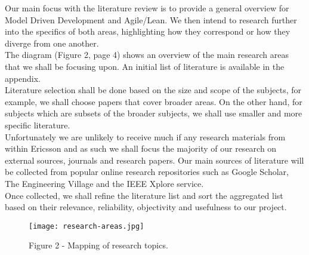 \documentclass[ProjectPlan_innit.tex]{subfiles}
\begin{document}
Our main focus with the literature review is to provide a general overview for Model Driven Development and Agile/Lean. We then intend to research further into the specifics of both areas, highlighting how they correspond or how they diverge from one another. 
\hspace{0pt} \\

The diagram (Figure 2, page 4) shows an overview of the main research areas that we shall be focusing upon. An initial list of literature is available in the appendix.
\hspace{0pt} \\

Literature selection shall be done based on the size and scope of the subjects, for example, we shall choose papers that cover broader areas. On the other hand, for subjects which are subsets of the broader subjects, we shall use smaller and more specific literature.
\hspace{0pt} \\

Unfortunately we are unlikely to receive much if any research materials from within Ericsson and as such we shall focus the majority of our research on external sources, journals and research papers. Our main sources of literature will be collected from popular online research repositories such as Google Scholar, The Engineering Village and the IEEE Xplore service. 
\hspace{0pt} \\

Once collected, we shall refine the literature list and sort the aggregated list based on their relevance, reliability, objectivity and usefulness to our project. 
\hspace{0pt} \\

\begin{figure*}[H!]
  \texttt{[image: research-areas.jpg]}
  \caption{Figure 2 - Mapping of research topics.}
  \label{BBB}
\end{figure*}
\end{document}
